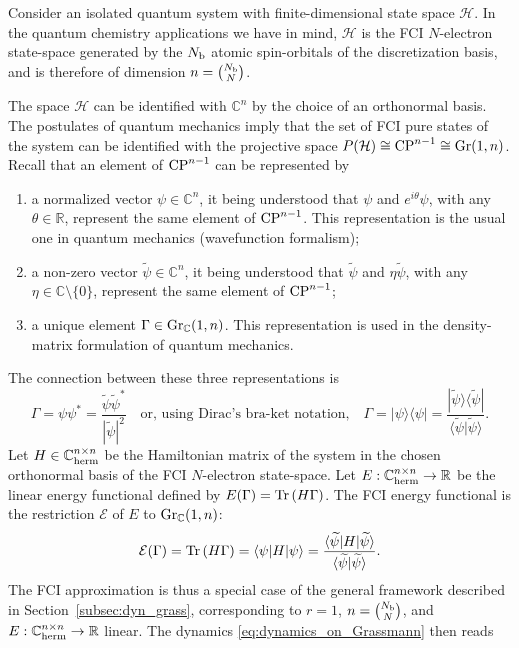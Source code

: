 \documentclass[11pt]{article}
\def\tr{{\rm Tr \,}}
\def\R{{\mathbb R}}
\def\C{{\mathbb C}}
\begin{document}
Consider an isolated quantum system with finite-dimensional state space $\mathcal H$.  In the quantum chemistry applications we have in mind, ${\mathcal H}$ is the FCI $N$-electron state-space generated by the $N_{\rm b}$ atomic spin-orbitals of the discretization basis, and is therefore of dimension $n=\binom{N_{\rm b}}{N}$. 

\medskip

The space $\mathcal H$ can be identified with $\C^n$ by the choice of an orthonormal basis. The postulates of quantum mechanics imply that the set of FCI pure states of the system can be identified with the projective space $P(\mathcal H) \cong {\rm CP}^{n-1}\cong {\rm Gr}(1,n)$. Recall that an element of ${\rm CP}^{n-1}$ can be represented by
\begin{enumerate}
\item a normalized vector $\psi \in \C^n$, it being understood that $\psi$ and $e^{i\theta}\psi$, with any $\theta \in \R$, represent the same element of ${\rm CP}^{n-1}$. This representation is the usual one in quantum mechanics (wavefunction formalism);
\item a non-zero vector $\widetilde\psi \in \C^n$, it being understood that $\widetilde\psi$ and $\eta \widetilde\psi$, with any $\eta \in \C\setminus\{0\}$, represent the same element of ${\rm CP}^{n-1}$;
\item a unique element $\Gamma \in {\rm Gr}_\C(1,n)$. This representation is used in the density-matrix formulation of quantum mechanics.
\end{enumerate}
The connection between these three representations is
$$
\Gamma = \psi\psi^* = \frac{\widetilde \psi \widetilde \psi^*}{|\widetilde\psi|^2} \quad \mbox{or, using Dirac's bra-ket notation,} \quad
\Gamma = |\psi\rangle \langle\psi| = \frac{|\widetilde \psi \rangle\langle \widetilde \psi|}{\langle \widetilde\psi|\widetilde\psi\rangle}.
$$
Let $H \in \C^{n \times n}_{\rm herm}$ be the Hamiltonian matrix of the system in the chosen orthonormal basis of the FCI $N$-electron state-space. Let $E: \C^{n \times n}_{\rm herm} \to \R$ be the linear energy functional defined by $E(\Gamma) = \tr(H\Gamma)$. The FCI energy functional is the restriction $\mathcal E$ of $E$ to ${\rm Gr}_\C(1,n)$:
$$
\mathcal E(\Gamma) = \tr(H\Gamma) = \langle \psi|H|\psi\rangle = \frac{\langle \widetilde\psi|H|\widetilde\psi\rangle}{\langle \widetilde\psi|\widetilde\psi\rangle}.
$$
The FCI approximation is thus a special case of the general framework described in Section~\ref{subsec:dyn_grass}, corresponding to $r=1$, $n=\binom{N_{\rm b}}{N}$, and $E: \C^{n \times n}_{\rm herm} \to \R$ linear. The dynamics  \eqref{eq:dynamics_on_Grassmann} then reads
\end{document}

